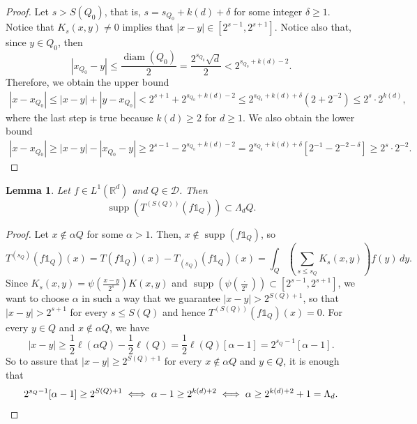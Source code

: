\documentclass[12pt]{amsart}
\newcommand{\R}{\mathbb{R}}
\newcommand{\diam}[1]{\operatorname{diam}\left(#1\right) }
\newcommand{\supp}[1]{\operatorname{supp}\left(#1\right) }
\newcommand{\one}{\mathds{1}}
\newcommand{\D}{\mathscr{D}}
\theoremstyle{plain}
\newtheorem{lemma}[theorem]{Lemma}
\theoremstyle{definition} %
\numberwithin{equation}{section}
\begin{document}
\begin{proof}
    Let $s>S(Q_0)$, that is, $s=s_{Q_0}+k(d)+\delta$ for some integer $\delta\geq 1$. Notice that $K_s(x,y)\neq 0$ implies that $|x-y|\in [2^{s-1},2^{s+1}]$.
    Notice also that, since $y\in Q_0$, then 
    \[
    |x_{Q_0}-y|
    \leq
    \frac{\diam{Q_0}}{2}
    =
    \frac{2^{s_{Q_0}}\sqrt{d}}{2}
    <
    2^{s_{Q_0}+k(d)-2}.
    \]
    Therefore, we obtain the upper bound
    \begin{align*}
        |x-x_{Q_0}|
        \leq 
        |x-y|+|y-x_{Q_0}|
        < 
        2^{s+1}+2^{s_{Q_0}+k(d)-2}
        \leq
        2^{s_{Q_0}+k(d)+\delta}(2+2^{-2})
        \leq 
        2^{s}\cdot 2^{k(d)},
    \end{align*}
    where the last step is true because $k(d)\geq 2$ for $d\geq 1$. We also obtain the lower bound
    \begin{align*}
        |x-x_{Q_0}|
        \geq 
        |x-y|-|x_{Q_0}-y|
        \geq 
        2^{s-1}-2^{s_{Q_0}+k(d)-2}
        =
        2^{s_{Q_0}+k(d)+\delta}[2^{-1}-2^{-2-\delta}]
        \geq 
        2^{s}\cdot 2^{-2}.
    \end{align*}
\end{proof}

\begin{lemma}\label{localizationTs}
    Let $f\in L^1(\R^d)$ and $Q\in \D$. Then 
    \begin{equation}\label{localizedSupport}
    \supp{T^{(S(Q))}(f\one_{Q})}
    \subset 
    \Lambda_dQ.    
    \end{equation}
\end{lemma}

\begin{proof}
    Let $x\not\in \alpha Q$ for some $\alpha>1$. Then, $x\not\in\supp{f\one_Q}$, so%
    \[
    T^{(s_Q)}(f\one_{Q})(x)
    =
    T(f\one_{Q})(x)
    -
    T_{(s_Q)}(f\one_{Q})(x)
    =
    \int_{Q}\left(\sum_{s\leq s_Q}K_s(x,y)\right)f(y)\, dy.
    \]
Since $K_s(x,y)=\psi(\frac{x-y}{2^s})K(x,y)$ and $\supp{\psi(\frac{\cdot}{2^s})}\subset [2^{s-1},2^{s+1}]$, we want to choose $\alpha$ in such a way that we guarantee $|x-y|>2^{S(Q)+1}$, so that $|x-y|>2^{s+1}$ for every $s\leq S(Q)$ and hence $T^{(S(Q))}(f\mathds{1}_{Q})(x)=0$. For every $y\in Q$ and $x\not\in\alpha Q$, we have 
    \[
    |x-y|
    \geq
    \frac{1}{2}\ell(\alpha Q)-\frac{1}{2}\ell(Q)
    =
    \frac{1}{2}\ell(Q)[\alpha-1]
    =
    2^{s_Q-1}[\alpha-1].
    \]
So to assure that $|x-y|\geq 2^{S(Q)+1}$ for every $x\not\in \alpha Q$ and $y\in Q$, it is enough that
    \[
    2^{s_Q-1}[\alpha-1]
    \geq
    2^{S(Q)+1}
    \iff 
    \alpha-1
    \geq
    2^{k(d)+2}
    \iff 
    \alpha 
    \geq
    2^{k(d)+2}+1
    =
    \Lambda_d.\qedhere
    \]
\end{proof}
\end{document}
